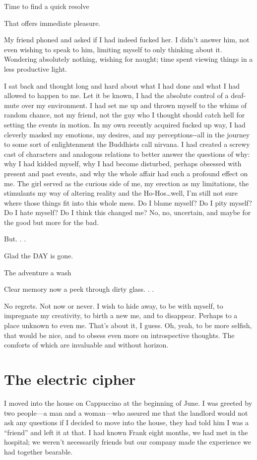 Time to find a quick resolve

That offers immediate pleasure.

My friend phoned and asked if I had indeed fucked her. I didn't answer
him, not even wishing to speak to him, limiting myself to only thinking
about it. Wondering absolutely nothing, wishing for naught; time spent
viewing things in a less productive light.

I sat back and thought long and hard about what I had done and what I
had allowed to happen to me. Let it be known, I had the absolute control
of a deaf-mute over my environment. I had set me up and thrown myself to
the whims of random chance, not my friend, not the guy who I thought
should catch hell for setting the events in motion. In my own recently
acquired fucked up way, I had cleverly masked my emotions, my desires,
and my perceptions-\/-all in the journey to some sort of enlightenment
the Buddhists call nirvana. I had created a screwy cast of characters
and analogous relations to better answer the questions of why: why I had
kidded myself, why I had become disturbed, perhaps obsessed with present
and past events, and why the whole affair had such a profound effect on
me. The girl served as the curious side of me, my erection as my
limitations, the stimulants my way of altering reality and the
Ho-Hos\ldots well, I'm still not sure where those things fit into this
whole mess. Do I blame myself? Do I pity myself? Do I hate myself? Do I
think this changed me? No, no, uncertain, and maybe for the good but
more for the bad.

But. . .

Glad the DAY is gone.

The adventure a wash

Clear memory now a peek through dirty glass. . .

No regrets. Not now or never. I wish to hide away, to be with myself, to
impregnate my creativity, to birth a new me, and to disappear. Perhaps
to a place unknown to even me. That's about it, I guess. Oh, yeah, to be
more selfish, that would be nice, and to obsess even more on
introspective thoughts. The comforts of which are invaluable and without
horizon.

\section{The electric cipher}\label{the-electric-cipher}

I moved into the house on Cappuccino at the beginning of June. I was
greeted by two people---a man and a woman---who assured me that the
landlord would not ask any questions if I decided to move into the
house, they had told him I was a ``friend'' and left it at that. I had
known Frank eight months, we had met in the hospital; we weren't
necessarily friends but our company made the experience we had together
bearable.

